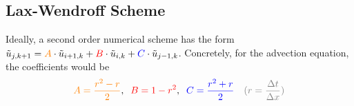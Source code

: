 \subsection{Lax-Wendroff Scheme}

Ideally, a second order numerical scheme has the form
$\tilde{u}_{j,k+1}={\color{orange}A}\cdot\tilde{u}_{i+1,k}+{\color{red}B}\cdot\tilde{u}_{i,k}+{\color{blue}C}\cdot\tilde{u}_{j-1,k}$.
Concretely, for the advection equation, the coefficients would be
\begin{align*}
	{\color{orange} A={\frac{r^{2}-r}{2}}},\;\;{\color{red} B=1-r^{2}},\;\;
	{\color{blue} C={\frac{r^{2}+r}{2}}}\quad
	{\color{gray} (r = \frac{\Delta t}{\Delta x})}
\end{align*}


